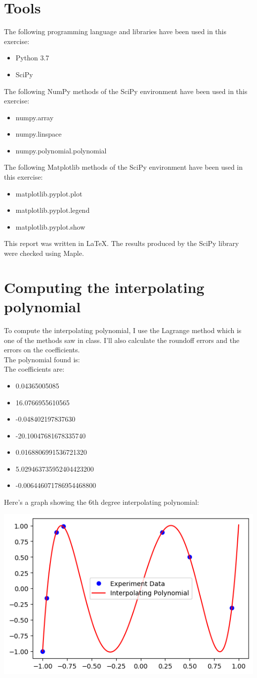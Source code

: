 \documentclass{article}
\begin{document}
\section{Tools}
The following programming language and libraries have been used in this exercise:
\begin{itemize}
  \item Python 3.7
  \item SciPy
\end{itemize}
The following NumPy methods of the SciPy environment have been used in this exercise:
\begin{itemize}
  \item numpy.array
  \item numpy.linspace
  \item numpy.polynomial.polynomial
  \end{itemize}
The following Matplotlib methods of the SciPy environment have been used in this exercise:
 \begin{itemize}
  \item matplotlib.pyplot.plot
  \item matplotlib.pyplot.legend
  \item matplotlib.pyplot.show
  \end{itemize}
This report was written in \LaTeX. The results produced by the SciPy library were checked using Maple.
  
\section{Computing the interpolating polynomial}
To compute the interpolating polynomial, I use the Lagrange method which is one of the methods saw in class. I'll also calculate the roundoff errors and the errors on the coefficients. \\
The polynomial found is: \\
[0.25cm]

The coefficients are: 
 \begin{itemize}
  \item 0.04365005085
  \item 16.0766955610565
  \item -0.048402197837630
  \item -20.10047681678335740
  \item 0.0168806991536721320
  \item 5.029463735952404423200
  \item -0.006446071786954468800
  \end{itemize}

Here's a graph showing the 6th degree interpolating polynomial:

\includegraphics{intpoly}
\end{document}
